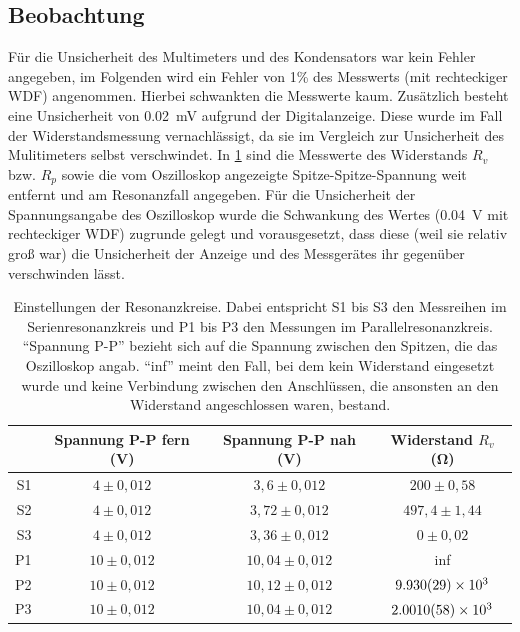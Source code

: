 \documentclass[
	a4paper,
	12pt,
	pagesize,
	ngerman
]{scrartcl}
\begin{document}
	\subsection{Beobachtung}
	Für die Unsicherheit des Multimeters und des Kondensators war kein Fehler angegeben, im Folgenden wird ein Fehler von 1\% des Messwerts (mit rechteckiger WDF) angenommen. %
	Hierbei schwankten die Messwerte kaum.
	Zusätzlich besteht eine Unsicherheit von \SI{0,02}{mV} aufgrund der Digitalanzeige.
	Diese wurde im Fall der Widerstandsmessung vernachlässigt, da sie im Vergleich zur Unsicherheit des Mulitimeters selbst verschwindet.
	In \cref{Grundwerte} sind die Messwerte des Widerstands $R_v$ bzw. $R_p$ sowie die vom Oszilloskop angezeigte Spitze-Spitze-Spannung weit entfernt und am Resonanzfall angegeben. %
	Für die Unsicherheit der Spannungsangabe des Oszilloskop wurde die Schwankung des Wertes (\SI{0,04}{\volt} mit rechteckiger WDF) zugrunde gelegt und vorausgesetzt, dass diese (weil sie relativ groß war) die Unsicherheit der Anzeige und des Messgerätes ihr gegenüber verschwinden lässt.
	\begin{table}[tb]
		\centering
		\begin{tabular}{ r | c | c | c }
			& Spannung P-P fern (\si{\volt}) & Spannung P-P nah (\si{\volt}) & Widerstand $R_v$(\si{\ohm})\\ \hline 
			S1& $4 \pm 0,012 $ & $3,6 \pm 0,012 $& $200 \pm 0,58$ \\ 
			S2& $4 \pm 0,012 $ & $3,72 \pm 0,012 $ & $497,4 \pm 1,44$ \\
			S3& $4 \pm 0,012 $ & $3,36 \pm 0,012 $ & $ 0 \pm 0,02 $\\
			P1& $ 10 \pm 0,012 $ & $10,04 \pm 0,012 $ & inf\\
			P2& $ 10 \pm 0,012 $ & $10,12 \pm 0,012 $ & $ \SI{9,93 \pm 0,029 e3}{} $\\
			P3& $ 10 \pm 0,012 $ & $10,04 \pm 0,012 $ & $ \SI{2,001 \pm 0,0058 e3}{} $\\
		\end{tabular}
		\caption{Einstellungen der Resonanzkreise. Dabei entspricht S1 bis S3 den Messreihen im Serienresonanzkreis und P1 bis P3 den Messungen im Parallelresonanzkreis. \enquote{Spannung P-P} bezieht sich auf die Spannung zwischen den Spitzen, die das Oszilloskop angab. \enquote{inf} meint den Fall, bei dem kein Widerstand eingesetzt wurde und keine Verbindung zwischen den Anschlüssen, die ansonsten an den Widerstand angeschlossen waren, bestand.}
		\label{Grundwerte} 
	\end{table}
\end{document}
